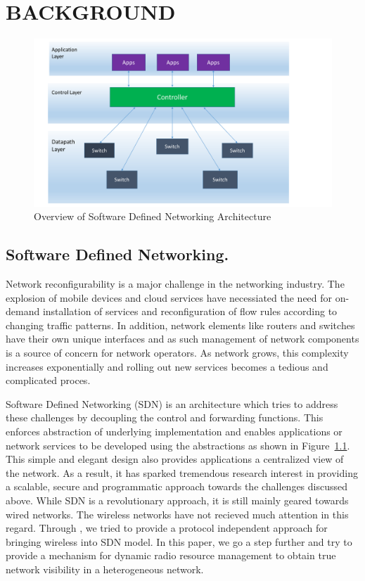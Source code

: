 \chapter{\uppercase {Background}}
\label{sec:background}
\begin{figure}[t]
  \centering
  \includegraphics[width=1\textwidth]{figures/SDN.pdf}
  \caption{Overview of Software Defined Networking Architecture}
  \label{fig:SDN}
\end{figure}

\section{Software Defined Networking.}
Network reconfigurability is a major challenge in the networking industry. The explosion of mobile devices and cloud services have necessiated the need for on-demand installation of services and reconfiguration of flow rules according to changing traffic patterns. In addition, network elements like routers and switches have their own unique interfaces and as such management of network components is a source of concern for network operators. As network grows, this complexity increases exponentially and rolling out new services becomes a tedious and complicated proces.

Software Defined Networking (SDN) is an architecture which tries to address these challenges by decoupling the control and forwarding functions. This enforces abstraction of underlying implementation and enables applications or network services to be developed using the abstractions as shown in Figure~\ref{fig:SDN}. This simple and elegant design also provides applications a centralized view of the network. As a result, it has sparked tremendous research interest in providing a scalable, secure and programmatic approach towards the challenges discussed above. While SDN is a revolutionary approach, it is still mainly geared towards wired networks. The wireless networks have not recieved much attention in this regard. Through \aetherflow, we tried to provide a protocol independent approach for bringing wireless into SDN model. In this paper, we go a step further and try to provide a mechanism for dynamic radio resource management to obtain true network visibility in a heterogeneous network.     

